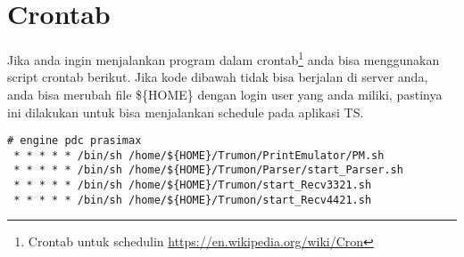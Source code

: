 \documentclass[11pt]{article}
\begin{document}
\section{Crontab}
\label{sec:org3c35d5d}
Jika anda ingin menjalankan program dalam crontab\footnote{Crontab untuk schedulin  \url{https://en.wikipedia.org/wiki/Cron}} anda bisa menggunakan script crontab berikut. 
Jika kode dibawah tidak bisa berjalan di server anda, anda bisa merubah file \$\{HOME\}
dengan login user yang anda miliki, pastinya ini dilakukan untuk bisa menjalankan schedule
pada aplikasi TS.
\begin{verbatim}
# engine pdc prasimax
 * * * * * /bin/sh /home/${HOME}/Trumon/PrintEmulator/PM.sh
 * * * * * /bin/sh /home/${HOME}/Trumon/Parser/start_Parser.sh
 * * * * * /bin/sh /home/${HOME}/Trumon/start_Recv3321.sh
 * * * * * /bin/sh /home/${HOME}/Trumon/start_Recv4421.sh
\end{verbatim}
\end{document}
